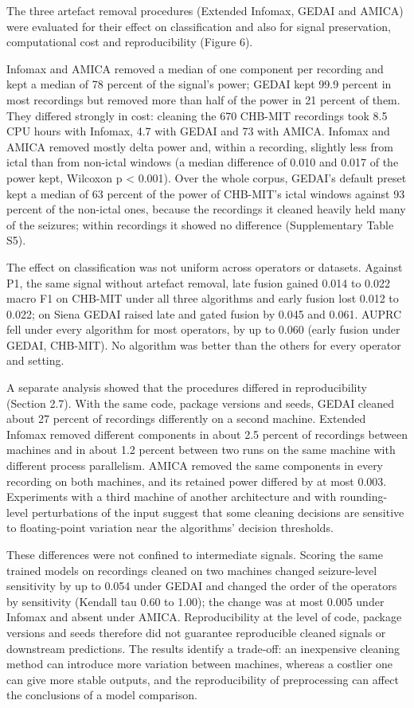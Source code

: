 \documentclass[11pt,a4paper]{article}
\begin{document}
The three artefact removal procedures (Extended Infomax, GEDAI and AMICA) were evaluated
for their effect on classification and also for signal preservation, computational cost
and reproducibility (Figure 6).

Infomax and AMICA removed a median of one component per recording and kept a median of
78 percent of the signal's power; GEDAI kept 99.9 percent in most recordings but removed
more than half of the power in 21 percent of them. They differed strongly in cost:
cleaning the 670 CHB-MIT recordings took 8.5 CPU hours with Infomax, 4.7 with GEDAI and
73 with AMICA. Infomax and AMICA removed mostly delta power and, within a recording,
slightly less from ictal than from non-ictal windows (a median difference of 0.010 and
0.017 of the power kept, Wilcoxon p \textless{} 0.001). Over the whole corpus, GEDAI's default
preset kept a median of 63 percent of the power of CHB-MIT's ictal windows against 93
percent of the non-ictal ones, because the recordings it cleaned heavily held many of the
seizures; within recordings it showed no difference (Supplementary Table S5).

The effect on classification was not uniform across operators or datasets. Against P1,
the same signal without artefact removal, late fusion gained 0.014 to 0.022 macro F1 on
CHB-MIT under all three algorithms and early fusion lost 0.012 to 0.022; on Siena GEDAI
raised late and gated fusion by 0.045 and 0.061. AUPRC fell under every algorithm for most
operators, by up to 0.060 (early fusion under GEDAI, CHB-MIT). No algorithm was better
than the others for every operator and setting.

A separate analysis showed that the procedures differed in reproducibility (Section 2.7).
With the same code, package versions and seeds, GEDAI cleaned about 27 percent of
recordings differently on a second machine. Extended Infomax removed different
components in about 2.5 percent of recordings between machines and in about 1.2 percent
between two runs on the same machine with different process parallelism. AMICA removed
the same components in every recording on both machines, and its retained power differed
by at most 0.003. Experiments with a third machine of another architecture and with
rounding-level perturbations of the input suggest that some cleaning decisions are
sensitive to floating-point variation near the algorithms' decision thresholds.

These differences were not confined to intermediate signals. Scoring the same trained
models on recordings cleaned on two machines changed seizure-level sensitivity by up to
0.054 under GEDAI and changed the order of the operators by sensitivity (Kendall tau 0.60
to 1.00); the change was at most 0.005 under Infomax and absent under AMICA.
Reproducibility at the level of code, package versions and seeds therefore did not
guarantee reproducible cleaned signals or downstream predictions. The results identify a
trade-off: an inexpensive cleaning method can introduce more variation between machines,
whereas a costlier one can give more stable outputs, and the reproducibility of
preprocessing can affect the conclusions of a model comparison.
\end{document}
